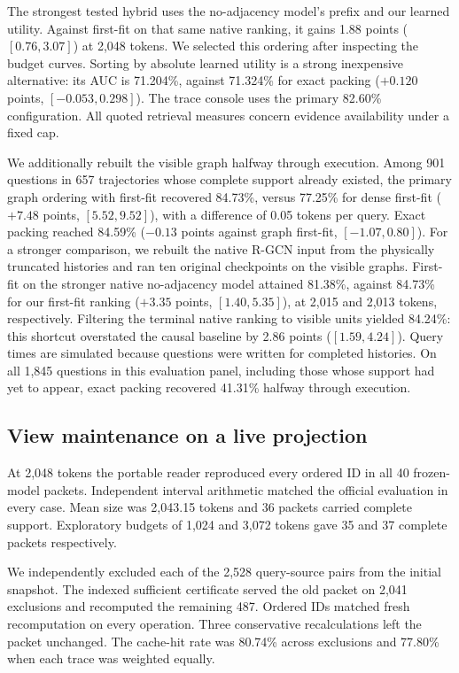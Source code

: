 \documentclass[conference]{IEEEtran}
\begin{document}
The strongest tested hybrid uses the no-adjacency model's prefix and our learned utility. Against first-fit on that same native ranking, it gains 1.88 points ($[0.76,3.07]$) at 2,048 tokens. We selected this ordering after inspecting the budget curves. Sorting by absolute learned utility is a strong inexpensive alternative: its AUC is 71.204\%, against 71.324\% for exact packing ($+0.120$ points, $[-0.053,0.298]$). The trace console uses the primary 82.60\% configuration. All quoted retrieval measures concern evidence availability under a fixed cap.

We additionally rebuilt the visible graph halfway through execution. Among 901 questions in 657 trajectories whose complete support already existed, the primary graph ordering with first-fit recovered 84.73\%, versus 77.25\% for dense first-fit ($+7.48$ points, $[5.52,9.52]$), with a difference of 0.05 tokens per query. Exact packing reached 84.59\% ($-0.13$ points against graph first-fit, $[-1.07,0.80]$). For a stronger comparison, we rebuilt the native R-GCN input from the physically truncated histories and ran ten original checkpoints on the visible graphs. First-fit on the stronger native no-adjacency model attained 81.38\%, against 84.73\% for our first-fit ranking ($+3.35$ points, $[1.40,5.35]$), at 2,015 and 2,013 tokens, respectively. Filtering the terminal native ranking to visible units yielded 84.24\%: this shortcut overstated the causal baseline by 2.86 points ($[1.59,4.24]$). Query times are simulated because questions were written for completed histories. On all 1,845 questions in this evaluation panel, including those whose support had yet to appear, exact packing recovered 41.31\% halfway through execution.

\subsection{View maintenance on a live projection}
At 2,048 tokens the portable reader reproduced every ordered ID in all 40 frozen-model packets. Independent interval arithmetic matched the official evaluation in every case. Mean size was 2,043.15 tokens and 36 packets carried complete support. Exploratory budgets of 1,024 and 3,072 tokens gave 35 and 37 complete packets respectively.

We independently excluded each of the 2,528 query-source pairs from the initial snapshot. The indexed sufficient certificate served the old packet on 2,041 exclusions and recomputed the remaining 487. Ordered IDs matched fresh recomputation on every operation. Three conservative recalculations left the packet unchanged. The cache-hit rate was 80.74\% across exclusions and 77.80\% when each trace was weighted equally.
\end{document}
